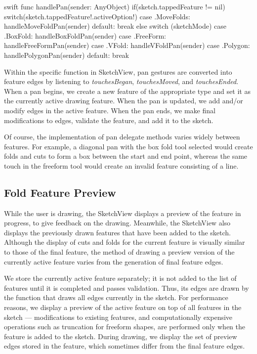 \small
\singlespacing 

\begin{pygmented}{swift}
    func handlePan(sender: AnyObject) {
        if(sketch.tappedFeature != nil){
            switch(sketch.tappedFeature!.activeOption!){
            case .MoveFolds:
                handleMoveFoldPan(sender)
            default: break
            }
        }
        else{
            switch (sketchMode) {
            case .BoxFold:
                handleBoxFoldPan(sender)
            case .FreeForm:
                handleFreeFormPan(sender)
            case .VFold:
                handleVFoldPan(sender)
            case .Polygon:
                handlePolygonPan(sender)
            default:
                break
            }
        }
    }
\end{pygmented}

\doublespacing
\normalsize

Within the specific function in SketchView, pan gestures are converted
into feature edges by listening to \emph{touchesBegan},
\emph{touchesMoved}, and \emph{touchesEnded}. When a pan begins, we
create a new feature of the appropriate type and set it as the currently
active drawing feature. When the pan is updated, we add and/or modify
edges in the active feature. When the pan ends, we make final
modifications to edges, validate the feature, and add it to the sketch.

Of course, the implementation of pan delegate methods varies widely
between features. For example, a diagonal pan with the box fold tool
selected would create folds and cuts to form a box between the start and
end point, whereas the same touch in the freeform tool would create an
invalid feature consisting of a line.

\subsection{Fold Feature Preview}\label{fold-feature-preview}

While the user is drawing, the SketchView displays a preview of the
feature in progress, to give feedback on the drawing. Meanwhile, the
SketchView also displays the previously drawn features that have been
added to the sketch. Although the display of cuts and folds for the
current feature is visually similar to those of the final feature, the
method of drawing a preview version of the currently active feature
varies from the generation of final feature edges.

We store the currently active feature separately; it is not added to the
list of features until it is completed and passes validation. Thus, its
edges are drawn by the function that draws all edges currently in the
sketch. For performance reasons, we display a preview of the active
feature on top of all features in the sketch --- modifications to
existing features, and computationally expensive operations such as
truncation for freeform shapes, are performed only when the feature is
added to the sketch. During drawing, we display the set of preview edges
stored in the feature, which sometimes differ from the final feature
edges.


